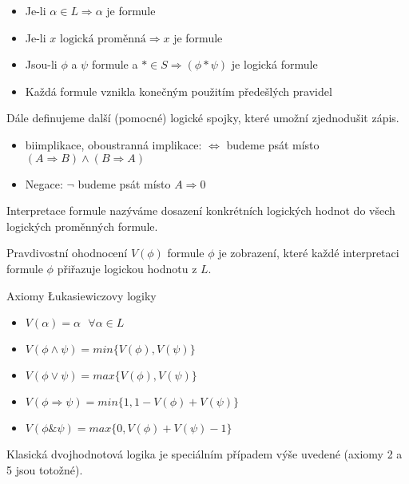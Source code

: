 \begin{definition}
\begin{itemize}
    \item Je-li $\alpha\in L \Rightarrow  \alpha $ je formule
    \item Je-li $x\textrm{ logická proměnná} \Rightarrow x$ je formule
    \item Jsou-li  $\phi$ a $\psi$ formule a $*\in S\Rightarrow (\phi * \psi )$ je logická formule
    \item Každá formule vznikla konečným použitím předešlých pravidel
\end{itemize}

\end{definition}

Dále definujeme další (pomocné) logické spojky, které umožní zjednodušit zápis.

\begin{definition}
\begin{itemize}
\item  biimplikace, oboustranná implikace: $\Leftrightarrow$ budeme psát místo $(A\Rightarrow B) \wedge (B\Rightarrow A) $
\item  Negace: $\neg$ budeme psát místo $A\Rightarrow 0$
\end{itemize}
\end{definition}

Interpretace formule nazýváme dosazení konkrétních logických hodnot do všech logických proměnných formule.

\begin{definition}
Pravdivostní ohodnocení $V(\phi)$ formule $\phi$ je zobrazení, které každé interpretaci formule $\phi$ přiřazuje logickou hodnotu z $L$.
\end{definition}


Axiomy Łukasiewiczovy logiky
\begin{itemize}
\item  $V(\alpha)=\alpha \ \ \ \forall \alpha\in L$
\item  $V(\phi \wedge \psi)=min\{ V(\phi),V(\psi)  \}$
\item  $V(\phi \vee \psi)=max\{ V(\phi),V(\psi)  \}$
\item  $V(\phi \Rightarrow \psi)=min\{1,1- V(\phi)+V(\psi)  \}$
\item  $V(\phi \& \psi)=max\{0,V(\phi)+V(\psi)-1  \}$
\end{itemize}

Klasická dvojhodnotová logika je speciálním případem výše uvedené (axiomy 2 a 5 jsou totožné).

